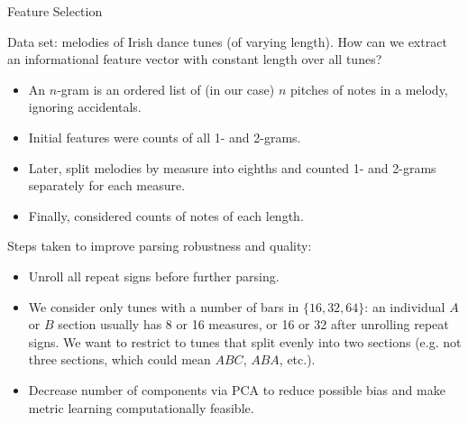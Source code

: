 \documentclass[letterpaper]{amsart}
\begin{document}
\begin{center}
\Huge
Feature Selection
\end{center}
\huge

Data set: melodies of Irish dance tunes (of varying length). How can we extract an informational feature vector with constant length over all tunes?
\begin{itemize}
\item An $n$-gram is an ordered list of (in our case) $n$ pitches of notes in a melody, ignoring accidentals.

\item Initial features were counts of all 1- and 2-grams.

\item Later, split melodies by measure into eighths and counted 1- and 2-grams separately for each measure.

\item Finally, considered counts of notes of each length.
\end{itemize}

Steps taken to improve parsing robustness and quality:
\begin{itemize}
\item Unroll all repeat signs before further parsing.

\item We consider only tunes with a number of bars in $\{16, 32, 64\}$: an individual $A$ or $B$ section usually has 8 or 16 measures, or 16 or 32 after unrolling repeat signs. We want to restrict to tunes that split evenly into two sections (e.g. not three sections, which could mean $ABC$, $ABA$, etc.).

\item Decrease number of components via PCA to reduce possible bias and make metric learning computationally feasible.
\end{itemize}
\end{document}
